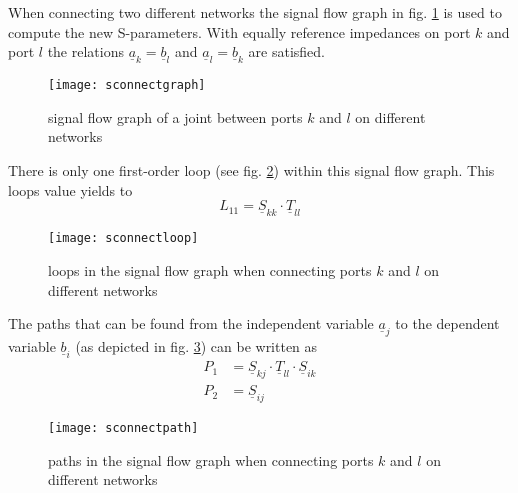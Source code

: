\addvspace{12pt}

When connecting two different networks the signal flow graph in
fig. \ref{fig:sconnectgraph} is used to compute the new S-parameters.
With equally reference impedances on port $k$ and port $l$ the
relations $\underline{a}_{k} = \underline{b}_{l}$ and
$\underline{a}_{l} = \underline{b}_{k}$ are satisfied.

\begin{figure}[ht]
\begin{center}
\texttt{[image: sconnectgraph]}
\end{center}
\caption{signal flow graph of a joint between ports $k$ and $l$ on different networks}
\label{fig:sconnectgraph}
\end{figure}
\FloatBarrier

There is only one first-order loop (see fig. \ref{fig:sconnectloop})
within this signal flow graph.  This loops value yields to
\begin{equation}
L_{11} = \underline{S}_{kk}\cdot \underline{T}_{ll}
\end{equation}

\begin{figure}[ht]
\begin{center}
\texttt{[image: sconnectloop]}
\end{center}
\caption{loops in the signal flow graph when connecting ports $k$ and $l$ on different networks}
\label{fig:sconnectloop}
\end{figure}
\FloatBarrier

The paths that can be found from the independent variable
$\underline{a}_{j}$ to the dependent variable $\underline{b}_{i}$ (as
depicted in fig. \ref{fig:sconnectpath}) can be written as
\begin{align}
P_{1} &= \underline{S}_{kj}\cdot \underline{T}_{ll} \cdot \underline{S}_{ik}\\
P_{2} &= \underline{S}_{ij}
\end{align}

\begin{figure}[ht]
\begin{center}
\texttt{[image: sconnectpath]}
\end{center}
\caption{paths in the signal flow graph when connecting ports $k$ and $l$ on different networks}
\label{fig:sconnectpath}
\end{figure}
\FloatBarrier

